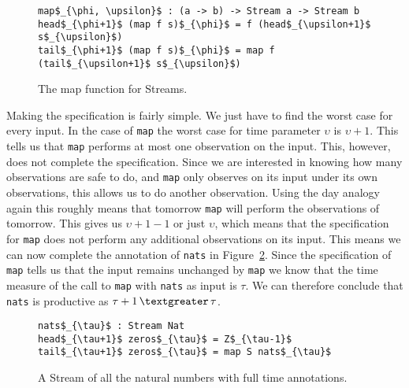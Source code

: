 \begin{figure}
\begin{Verbatim}[commandchars=\\\{\},codes={\catcode`$=3\catcode`_=8}]
map$_{\phi, \upsilon}$ : (a -> b) -> Stream a -> Stream b
head$_{\phi+1}$ (map f s)$_{\phi}$ = f (head$_{\upsilon+1}$ s$_{\upsilon}$)
tail$_{\phi+1}$ (map f s)$_{\phi}$ = map f (tail$_{\upsilon+1}$ s$_{\upsilon}$)
\end{Verbatim}
\caption{The map function for Streams.}
\label{fig:map}
\end{figure}

Making the specification is fairly simple. We just have to find the worst case for every input. In the case of \texttt{map} the worst case for time parameter $\upsilon$ is $\upsilon+1$. This tells us that \texttt{map} performs at most one observation on the input. This, however, does not complete the specification. Since we are interested in knowing how many observations are safe to do, and \texttt{map} only observes on its input under its own observations, this allows us to do another observation. Using the day analogy again this roughly means that tomorrow \texttt{map} will perform the observations of tomorrow. This gives us $\upsilon+1-1$ or just $\upsilon$, which means that the specification for \texttt{map} does not perform any additional observations on its input. This means we can now complete the annotation of \texttt{nats} in Figure~\ref{fig:natsComplete}. Since the specification of \texttt{map} tells us that the input remains unchanged by \texttt{map} we know that the time measure of the call to \texttt{map} with \texttt{nats} as input is $\tau$. We can therefore conclude that \texttt{nats} is productive as $\tau+1\,\textgreater\,\tau$.

\begin{figure}
\begin{Verbatim}[commandchars=\\\{\},codes={\catcode`$=3\catcode`_=8}]
nats$_{\tau}$ : Stream Nat
head$_{\tau+1}$ zeros$_{\tau}$ = Z$_{\tau-1}$
tail$_{\tau+1}$ zeros$_{\tau}$ = map S nats$_{\tau}$
\end{Verbatim}
\caption{A Stream of all the natural numbers with full time annotations.}
\label{fig:natsComplete}
\end{figure}

